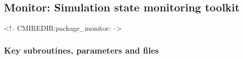\subsection{Monitor: Simulation state monitoring toolkit}
\label{sec:pkg:monitor}
\begin{rawhtml}
<!-- CMIREDIR:package_monitor: -->
\end{rawhtml}

\subsubsection{Key subroutines, parameters and files}
\label{sec:pkg:monitor:implementation_synopsis}
